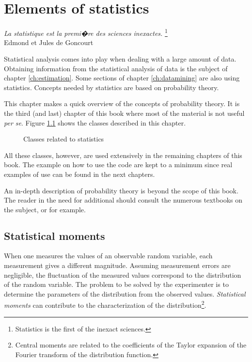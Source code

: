 \documentclass[twoside]{book}
\begin{document}
\fi

\chapter{Elements of statistics}
\label{ch:statistics} \vspace{1 ex}
\begin{flushright} {\sl La statistique est la premi�re des sciences inexactes.}
\footnote{Statistics is the first of the inexact sciences.}\\
Edmond et Jules de Goncourt
\end{flushright}
\vspace{1 ex} Statistical analysis comes into play when dealing
with a large amount of data. Obtaining information from the
statistical analysis of data is the subject of chapter
\ref{ch:estimation}. Some sections of chapter \ref{ch:datamining}
are also using statistics. Concepts needed by statistics are based
on probability theory.

This chapter makes a quick overview of the concepts of probability
theory. It is the third (and last) chapter of this book where most
of the material is not useful {\it per se}. Figure
\ref{fig:statisticsclasses} shows the classes described in this
chapter.
\begin{figure}
\center{}
\caption{Classes related to statistics}
\label{fig:statisticsclasses}
\end{figure}
All these classes, however, are used extensively in the remaining
chapters of this book. The example on how to use the code are kept
to a minimum since real examples of use can be found in the next
chapters.

An in-depth description of probability theory is beyond the scope
of this book. The reader in the need for additional should consult
the numerous textbooks on the subject, \cite{PhiTay} or
\cite{LawKel} for example.

\section{Statistical moments}
\label{sec:moments} When one measures the values of an observable
random variable, each measurement gives a different magnitude.
Assuming measurement errors are negligible, the fluctuation of the
measured values correspond to the distribution of the random
variable. The problem to be solved by the experimenter is to
determine the parameters of the distribution from the observed
values. {\sl Statistical moments} can contribute to the
characterization of the distribution\footnote{Central moments are
related to the coefficients of the Taylor expansion of the Fourier
transform of the distribution function.}.
\end{document}
